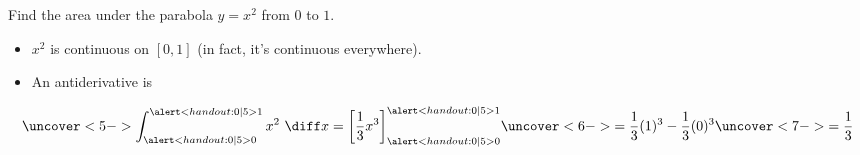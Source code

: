 \begin{frame}
\begin{example}%
Find the area under the parabola $y = x^2$ from $0$ to $1$.
\begin{itemize}
\item<2->  $x^2$ is continuous on $[0, 1]$ (in fact, it's continuous everywhere).
\item<3-| alert@3-4>  An antiderivative is 
\end{itemize}
\[
\uncover<5->{%
\int_{\alert<handout:0| 5>{0}}^{\alert<handout:0| 5>{1}} x^2 \ \diff x = \left[ \frac{1}{3}x^3\right]_{\alert<handout:0| 5>{0}}^{\alert<handout:0| 5>{1}} %
}%
\uncover<6->{%
 = \frac{1}{3}(1)^3 - \frac{1}{3}(0)^3 %
}%
\uncover<7->{%
 = \frac{1}{3}%
}%
\]
\end{example}
\end{frame}
